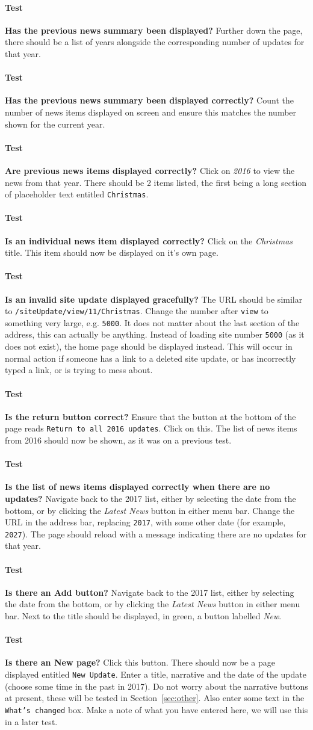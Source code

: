 \documentclass[12pt]{article}
\newcounter{Test}
\newcommand{\test}[1]{%
\stepcounter{Test}%
\paragraph{Test \theTest} \textbf{#1} }
\begin{document}
\test{Has the previous news summary been displayed?}
Further down the page, there should be a list of years alongside the corresponding number of updates for that year.

\test{Has the previous news summary been displayed correctly?}
Count the number of news items displayed on screen and ensure this matches the number shown for the current year.

\test{Are previous news items displayed correctly?}
Click on \textit{2016} to view the news from that year. There should be 2 items listed, the first being a long section of placeholder text entitled \texttt{Christmas}.

\test{Is an individual news item displayed correctly?}
Click on the \textit{Christmas} title. This item should now be displayed on it's own page.

\test{Is an invalid site update displayed gracefully?}
The URL should be similar to \texttt{/siteUpdate/view/11/Christmas}. Change the number after \texttt{view} to something very large, e.g. \texttt{5000}. It does not matter about the last section of the address, this can actually be anything. Instead of loading site number \texttt{5000} (as it does not exist), the home page should be displayed instead. This will occur in normal action if someone has a link to a deleted site update, or has incorrectly typed a link, or is trying to mess about.

\test{Is the return button correct?}
Ensure that the button at the bottom of the page reads \texttt{Return to all 2016 updates}. Click on this. The list of news items from 2016 should now be shown, as it was on a previous test.

\test{Is the list of news items displayed correctly when there are no updates?}
Navigate back to the 2017 list, either by selecting the date from the bottom, or by clicking the \textit{Latest News} button in either menu bar. Change the URL in the address bar, replacing \texttt{2017}, with some other date (for example, \texttt{2027}). The page should reload with a message indicating there are no updates for that year.

\test{Is there an Add button?}
Navigate back to the 2017 list, either by selecting the date from the bottom, or by clicking the \textit{Latest News} button in either menu bar. Next to the title should be displayed, in green, a button labelled \textit{New}.

\test{Is there an New page?}
Click this button. There should now be a page displayed entitled \texttt{New Update}. Enter a title, narrative and the date of the update (choose some time in the past in 2017). Do not worry about the narrative buttons at present, these will be tested in Section~\ref{sec:other}. Also enter some text in the \texttt{What's changed} box. Make a note of what you have entered here, we will use this in a later test.
\end{document}
